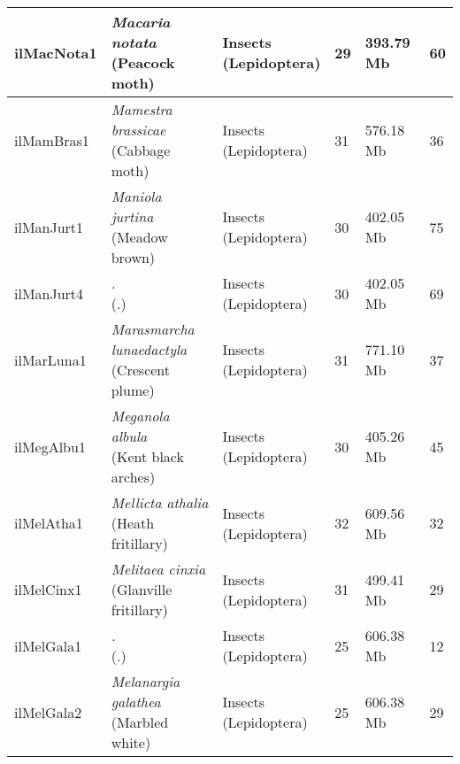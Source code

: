 \begin{centering}
\begin{longtable}{l|l|l|l|l|l}
ilMacNota1 & \makecell[{l}]{\textit{Macaria notata} \\ (Peacock moth)} & \makecell[{l}]{Insects \\ (Lepidoptera)} & 29 & 393.79 Mb & 60  \\ \hline
ilMamBras1 & \makecell[{l}]{\textit{Mamestra brassicae} \\ (Cabbage moth)} & \makecell[{l}]{Insects \\ (Lepidoptera)} & 31 & 576.18 Mb & 36  \\ \hline
ilManJurt1 & \makecell[{l}]{\textit{Maniola jurtina} \\ (Meadow brown)} & \makecell[{l}]{Insects \\ (Lepidoptera)} & 30 & 402.05 Mb & 75  \\ \hline
ilManJurt4 & \makecell[{l}]{\textit{.} \\ (.)} & \makecell[{l}]{Insects \\ (Lepidoptera)} & 30 & 402.05 Mb & 69  \\ \hline
ilMarLuna1 & \makecell[{l}]{\textit{Marasmarcha lunaedactyla} \\ (Crescent plume)} & \makecell[{l}]{Insects \\ (Lepidoptera)} & 31 & 771.10 Mb & 37  \\ \hline
ilMegAlbu1 & \makecell[{l}]{\textit{Meganola albula} \\ (Kent black arches)} & \makecell[{l}]{Insects \\ (Lepidoptera)} & 30 & 405.26 Mb & 45  \\ \hline
ilMelAtha1 & \makecell[{l}]{\textit{Mellicta athalia} \\ (Heath fritillary)} & \makecell[{l}]{Insects \\ (Lepidoptera)} & 32 & 609.56 Mb & 32  \\ \hline
ilMelCinx1 & \makecell[{l}]{\textit{Melitaea cinxia} \\ (Glanville fritillary)} & \makecell[{l}]{Insects \\ (Lepidoptera)} & 31 & 499.41 Mb & 29  \\ \hline
ilMelGala1 & \makecell[{l}]{\textit{.} \\ (.)} & \makecell[{l}]{Insects \\ (Lepidoptera)} & 25 & 606.38 Mb & 12  \\ \hline
ilMelGala2 & \makecell[{l}]{\textit{Melanargia galathea} \\ (Marbled white)} & \makecell[{l}]{Insects \\ (Lepidoptera)} & 25 & 606.38 Mb & 29  \\ \hline

\end{longtable}
\end{centering}
